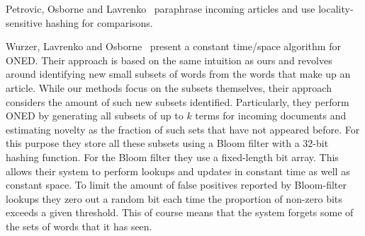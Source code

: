 
Petrovic, Osborne and Lavrenko~\cite{petrovic2012using} paraphrase incoming articles and use locality-sensitive hashing for comparisons. 

Wurzer, Lavrenko and Osborne~\cite{wurzer2015kterm} present a constant time/space algorithm for ONED. Their approach is based on the same intuition as ours and revolves around identifying new small subsets of words from the words that make up an article. While our methods focus on the subsets themselves, their approach considers the amount of such new subsets identified. Particularly, they perform ONED by generating all subsets of up to $k$ terms for incoming documents and estimating novelty as the fraction of such sets that have not appeared before. 
For this purpose they store all these subsets using a Bloom filter with a 32-bit hashing function. For the Bloom filter they use a fixed-length bit array. This allows their system to perform lookups and updates in constant time as well as constant space. To limit the amount of false positives reported by Bloom-filter lookups they zero out a random bit each time the proportion of non-zero bits exceeds a given threshold. This of course means that the system forgets some of the sets of words that it has seen.
